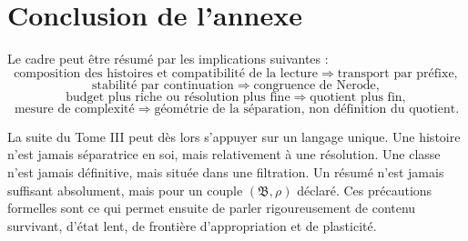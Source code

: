 \section{Conclusion de l'annexe}
\label{annexe-histoires-conclusion}

Le cadre peut être résumé par les implications suivantes :
\[
\text{composition des histoires et compatibilité de la lecture}
\Longrightarrow
\text{transport par préfixe},
\]
\[
\text{stabilité par continuation}
\Longrightarrow
\text{congruence de Nerode},
\]
\[
\text{budget plus riche ou résolution plus fine}
\Longrightarrow
\text{quotient plus fin},
\]
\[
\text{mesure de complexité}
\Longrightarrow
\text{géométrie de la séparation, non définition du quotient}.
\]

La suite du Tome III peut dès lors s'appuyer sur un langage unique. Une
histoire n'est jamais séparatrice en soi, mais relativement à une
résolution. Une classe n'est jamais définitive, mais située dans une
filtration. Un résumé n'est jamais suffisant absolument, mais pour un
couple \((\mathfrak B,\rho)\) déclaré. Ces précautions formelles sont
ce qui permet ensuite de parler rigoureusement de contenu survivant,
d'état lent, de frontière d'appropriation et de plasticité.

